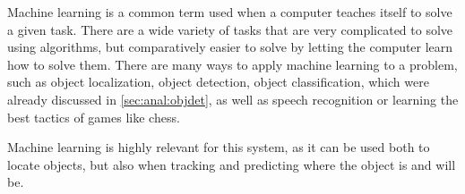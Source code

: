 Machine learning is a common term used when a computer teaches itself to solve a given task\cite{ArtificialIntelligencealanpoole}. 
There are a wide variety of tasks that are very complicated to solve using algorithms, but comparatively easier to solve by letting the computer learn how to solve them. 
There are many ways to apply machine learning to a problem, such as object localization, object detection, object classification, which were already discussed in \autoref{sec:anal:objdet}, as well as speech recognition or learning the best tactics of games like chess.

Machine learning is highly relevant for this system, as it can be used both to locate objects, but also when tracking and predicting where the object is and will be.
